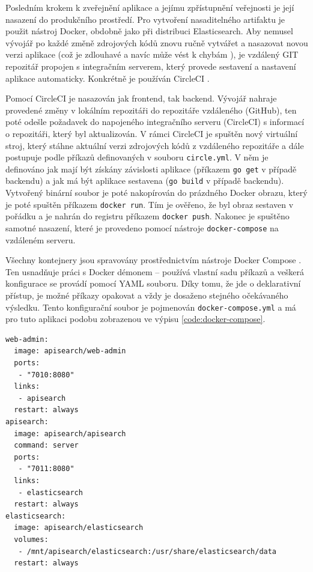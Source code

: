 \documentclass[FM,DP]{tulthesis}
\newenvironment{code}
    {\filbreak\captionsetup{type=listing}}{\filbreak}
\begin{document}
Posledním krokem k zveřejnění aplikace a jejímu zpřístupnění veřejnosti je její nasazení 
do produkčního prostředí. Pro vytvoření nasaditelného artifaktu je použit nástroj Docker, 
obdobně jako při distribuci Elasticsearch. Aby nemusel vývojář po každé změně zdrojových
kódů znovu ručně vytvářet a nasazovat novou verzi aplikace (což je zdlouhavé a navíc může
vést k chybám \cite[strana~23]{devops}), je vzdálený GIT repozitář propojen s integračním 
serverem, který provede sestavení a nastavení aplikace automaticky. Konkrétně je používán 
CircleCI \cite{circleci}.

Pomocí CircleCI je nasazován jak frontend, tak backend. Vývojář nahraje provedené změny
v lokálním repozitáři do repozitáře vzdáleného (GitHub), ten poté odešle požadavek do
napojeného integračního serveru (CircleCI) s informací o repozitáři, který byl aktualizován.
V rámci CircleCI je spuštěn nový virtuální stroj, který stáhne aktuální verzi zdrojových kódů
z vzdáleného repozitáře a dále postupuje podle příkazů definovaných v souboru \verb|circle.yml|.
V něm je definováno jak mají být získány závislosti aplikace (příkazem \verb|go get| v případě 
backendu) a jak má být aplikace sestavena (\verb|go build| v případě backendu). Vytvořený binární
soubor je poté nakopírován do prázdného Docker obrazu, který je poté spuštěn příkazem \verb|docker run|. 
Tím je ověřeno, že byl obraz sestaven v pořádku a je nahrán do registru příkazem \verb|docker push|.
Nakonec je spuštěno samotné nasazení, které je provedeno pomocí nástroje \verb|docker-compose|
na vzdáleném serveru.

Všechny kontejnery jsou spravovány prostřednictvím nástroje Docker Compose \cite{compose}.
Ten usnadňuje práci s Docker démonem -- používá vlastní sadu příkazů a veškerá konfigurace
se provádí pomocí YAML souboru. Díky tomu, že jde o deklarativní přístup, je možné
příkazy opakovat a vždy je dosaženo stejného očekávaného výsledku. Tento konfigurační 
soubor je pojmenován \verb|docker-compose.yml| a má pro tuto aplikaci podobu zobrazenou 
ve výpisu \ref{code:docker-compose}.

\begin{code}
\captionsetup{singlelinecheck=false,justification=raggedright}
\label{code:docker-compose}
\begin{verbatim}
web-admin:
  image: apisearch/web-admin
  ports:
   - "7010:8080"
  links:
   - apisearch
  restart: always
apisearch:
  image: apisearch/apisearch
  command: server
  ports:
   - "7011:8080"
  links:
   - elasticsearch
  restart: always
elasticsearch:
  image: apisearch/elasticsearch
  volumes:
   - /mnt/apisearch/elasticsearch:/usr/share/elasticsearch/data
  restart: always
\end{verbatim}
\end{code}
\end{document}
